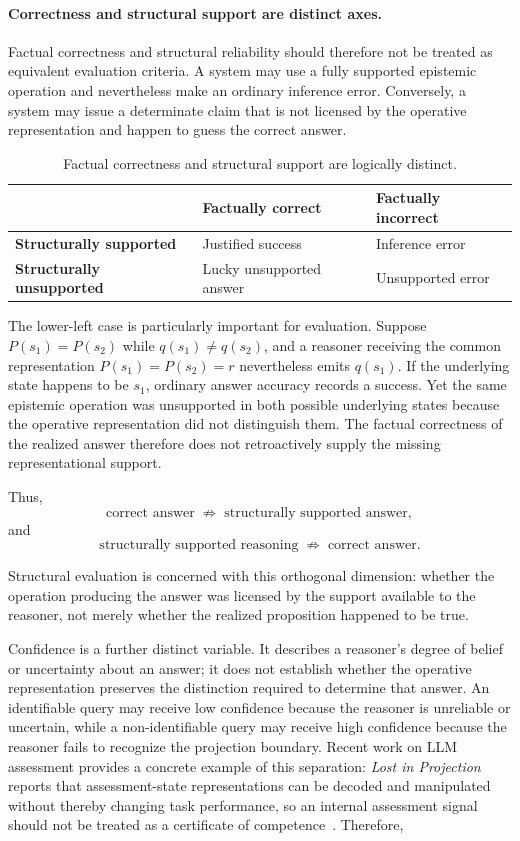\documentclass[11pt]{article}
\theoremstyle{definition}
\theoremstyle{remark}
\begin{document}
\paragraph{Correctness and structural support are distinct axes.}
Factual correctness and structural reliability should therefore not be treated as equivalent evaluation criteria. A system may use a fully supported epistemic operation and nevertheless make an ordinary inference error. Conversely, a system may issue a determinate claim that is not licensed by the operative representation and happen to guess the correct answer.

\begin{table}[h]
\centering
\caption{Factual correctness and structural support are logically distinct.}
\label{tab:correctness_support}
\begin{tabular}{lll}
\toprule
& \textbf{Factually correct} & \textbf{Factually incorrect} \\
\midrule
\textbf{Structurally supported}
& Justified success
& Inference error \\
\textbf{Structurally unsupported}
& Lucky unsupported answer
& Unsupported error \\
\bottomrule
\end{tabular}
\end{table}

The lower-left case is particularly important for evaluation. Suppose \(P(s_1)=P(s_2)\) while \(q(s_1)\neq q(s_2)\), and a reasoner receiving the common representation \(P(s_1)=P(s_2)=r\) nevertheless emits \(q(s_1)\). If the underlying state happens to be \(s_1\), ordinary answer accuracy records a success. Yet the same epistemic operation was unsupported in both possible underlying states because the operative representation did not distinguish them. The factual correctness of the realized answer therefore does not retroactively supply the missing representational support.

Thus,
\[
\boxed{
\text{correct answer}
\;\not\Rightarrow\;
\text{structurally supported answer},
}
\]
and
\[
\boxed{
\text{structurally supported reasoning}
\;\not\Rightarrow\;
\text{correct answer}.
}
\]

Structural evaluation is concerned with this orthogonal dimension: whether the operation producing the answer was licensed by the support available to the reasoner, not merely whether the realized proposition happened to be true.

Confidence is a further distinct variable. It describes a reasoner's degree of belief or uncertainty about an answer; it does not establish whether the operative representation preserves the distinction required to determine that answer. An identifiable query may receive low confidence because the reasoner is unreliable or uncertain, while a non-identifiable query may receive high confidence because the reasoner fails to recognize the projection boundary. Recent work on LLM assessment provides a concrete example of this separation: \emph{Lost in Projection} reports that assessment-state representations can be decoded and manipulated without thereby changing task performance, so an internal assessment signal should not be treated as a certificate of competence~\cite{LostProjection2026}. Therefore,
\end{document}
